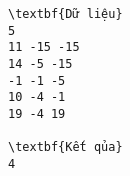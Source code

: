 \begin{verbatim}
\textbf{Dữ liệu} 
5
11 -15 -15
14 -5 -15
-1 -1 -5
10 -4 -1
19 -4 19

\textbf{Kết qủa} 
4 
\end{verbatim}